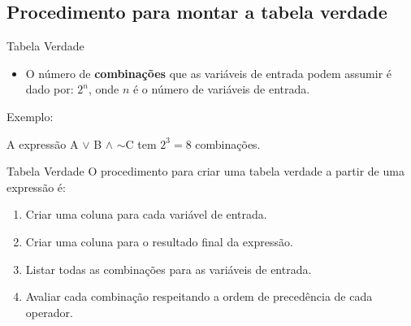 
\subsection{Procedimento para montar a tabela verdade}


\begin{frame}{Tabela Verdade}

	\begin{itemize}
		\item O número de \textbf{combinações} que as variáveis de entrada podem assumir é dado por: $2^n$, onde $n$ é o número de variáveis de entrada.
	\end{itemize}

	Exemplo:

	A expressão A $\vee$ B $\wedge$ $\sim$C tem $2^3=8$ combinações.
\end{frame}

\begin{frame}{Tabela Verdade}
O procedimento para criar uma tabela verdade a partir de uma expressão é:

\begin{enumerate}
	\item Criar uma coluna para cada variável de entrada.
	\item Criar uma coluna para o resultado final da expressão.
	\item Listar todas as combinações para as variáveis de entrada. 
	\item Avaliar cada combinação respeitando a ordem de precedência de cada operador.
\end{enumerate}

\end{frame}



